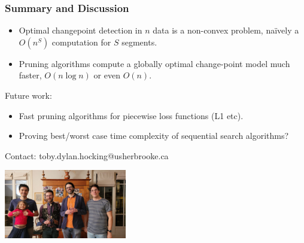 \documentclass{beamer}
\begin{document}
\begin{frame}[fragile]
  \frametitle{Summary and Discussion}

  \begin{itemize}
  \item Optimal changepoint detection in $n$ data is a non-convex
    problem, na\" ively a $O(n^S)$ computation for $S$ segments.
  \item Pruning algorithms compute a globally optimal change-point
    model much faster, $O(n\log n)$ or even $O(n)$.
  \end{itemize}
  Future work:   
  \begin{itemize}
  \item Fast pruning algorithms for piecewise loss
    functions (L1 etc).
  \item Proving best/worst case time complexity of sequential search
    algorithms?
  \end{itemize}
  Contact: toby.dylan.hocking@usherbrooke.ca

  \centering
\includegraphics[height=3cm]{2025-01-photo-charles-toby-guillem-vincent.jpg}  
\end{frame}
\end{document}
